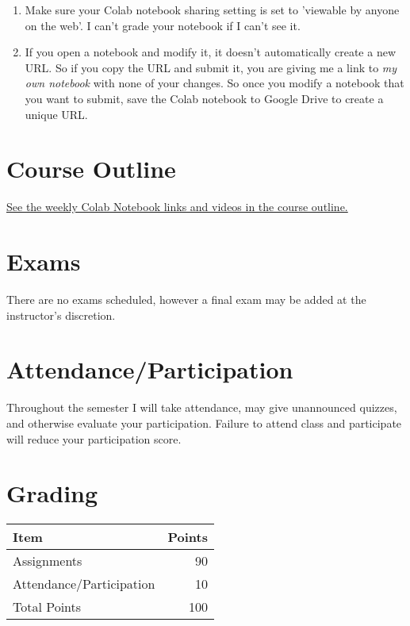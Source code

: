 \documentclass[11pt]{article}
\begin{document}
\begin{enumerate}
\item Make sure your Colab notebook sharing setting is set to 'viewable by anyone on the web'.  I can't grade your notebook if I can't see it.
\item If you open a notebook and modify it, it doesn't automatically create a new URL.  So if you copy the URL and submit it, you are giving me a link to \emph{my own notebook} with none of your changes. So once you modify a notebook that you want to submit, save the Colab notebook to Google Drive to create a unique URL.
\end{enumerate}
\section{Course Outline}
\label{sec:org9a2810b}

\href{https://financial-education.github.io/python\_for\_finance\_outline/}{See the weekly Colab Notebook links and videos in the course outline.}
\section{Exams}
\label{sec:org55eabac}

There are no exams scheduled, however a final exam may be added at the instructor's discretion. 
\section{Attendance/Participation}
\label{sec:org90d6dde}

Throughout the semester I will take attendance, may give unannounced quizzes, and otherwise evaluate your participation.  Failure to attend class and participate will reduce your participation score.
\section{Grading}
\label{sec:orgd6ab23e}

\begin{center}


\begin{center}
\begin{tabular}{lr}
Item & Points\\
\hline
Assignments & 90\\
Attendance/Participation & 10\\
\hline
Total Points & 100\\
\hline
\end{tabular}
\end{center}
\end{center}
\end{document}
